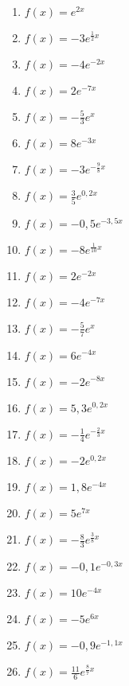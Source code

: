 \begin{Exercise}[title={Bestimme den y-Achsenabschnitt, skizziere das Schaubild, gib die Asymptote, das Verhalten für \(x\rightarrow \pm\infty\) und die Monotonie an}, label=eFktA1]\\
	\begin{minipage}{\textwidth}
		\begin{minipage}{0.49\textwidth}
			\begin{enumerate}[label=\alph*)]
				\item \(f(x)=e^{2x}\)
				\item \(f(x)=-3e^{\frac{1}{2}x}\)
				\item \(f(x)=-4e^{-2x}\)
				\item \(f(x)=2e^{-7x}\)
				\item \(f(x)=-\frac{5}{3}e^{x}\)
				\item \(f(x)=8e^{-3x}\)
				\item \(f(x)=-3e^{-\frac{9}{8}x}\)
				\item \(f(x)=\frac{3}{5}e^{0,2x}\)
				\item \(f(x)=-0,5e^{-3,5x}\)
				\item \(f(x)=-8e^{\frac{1}{10}x}\)
				\item \(f(x)=2e^{-2x}\)
				\item \(f(x)=-4e^{-7x}\)
				\item \(f(x)=-\frac{5}{7}e^{x}\)
			\end{enumerate}
		\end{minipage}
		\begin{minipage}{0.49\textwidth}
			\begin{enumerate}[label=\alph*)]
				\setcounter{enumi}{13}
				\item \(f(x)=6e^{-4x}\)
				\item \(f(x)=-2e^{-8x}\)
				\item \(f(x)=5,3e^{0,2x}\)
				\item \(f(x)=-\frac{1}{4}e^{-\frac{2}{3}x}\)
				\item \(f(x)=-2e^{0,2x}\)
				\item \(f(x)=1,8e^{-4x}\)
				\item \(f(x)=5e^{7x}\)
				\item \(f(x)=-\frac{8}{3}e^{\frac{3}{8}x}\)
				\item \(f(x)=-0,1e^{-0,3x}\)
				\item \(f(x)=10e^{-4x}\)
				\item \(f(x)=-5e^{6x}\)
				\item \(f(x)=-0,9e^{-1,1x}\)
				\item \(f(x)=\frac{11}{6}e^{\frac{8}{7}x}\)
			\end{enumerate}
		\end{minipage}
	\end{minipage}
\end{Exercise}
